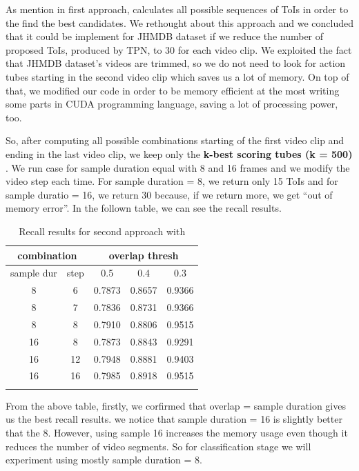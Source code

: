 \documentclass{report}
\begin{document}
As mention in first approach,  \cite{DBLP:journals/corr/HouCS17} calculates all possible sequences of ToIs in order to the find the best
candidates. We rethought about this approach and we concluded that it could be implement for JHMDB dataset if we reduce the number of proposed
ToIs, produced by TPN,  to 30 for each video clip. We exploited the fact that JHMDB dataset's videos are trimmed, so we do not need to look
for action tubes starting in the second video clip which saves us a lot of memory. On top of that, we modified our code
in order to be memory efficient at the most writing some parts in CUDA programming language, saving a lot of processing power, too. \par
So, after computing all possible combinations starting of the first video clip and ending in the last video clip, we keep only the
\textbf{k-best scoring tubes (k = 500) }. We run case for sample duration equal with 8 and 16 frames and we modify the video step each time.
For sample duration = 8, we return only 15 ToIs and for sample duratio = 16, we return 30 because, if we return more, we get ``out of memory error''.
In the follown table, we can see the recall results. \par

\begin{center}
\begin{longtable}{||c c||c c c||}

  \hline
  \multicolumn{2}{||c||}{\textbf{combination}} &\multicolumn{3}{|c||}{\textbf{overlap thresh}}\\
  \hline
  sample dur & step &  0.5  &  0.4 &  0.3 \\
  \hline   \hline

  8 & 6 & 0.7873 & 0.8657 & 0.9366  \\
  \hline
  8 & 7 & 0.7836 & 0.8731 & 0.9366  \\
  \hline
  8 &  8 & 0.7910 & 0.8806 & 0.9515 \\
  \hline 

  16 & 8  & 0.7873 & 0.8843 & 0.9291 \\
  \hline
  16 & 12 & 0.7948 & 0.8881 & 0.9403 \\
  \hline
  16 & 16 & 0.7985 & 0.8918 & 0.9515 \\
  \hline \hline
  \caption{Recall results for second approach with  }
  \label{table:conn_app3}
\end{longtable} 
\end{center}

From the above table, firstly, we corfirmed that overlap = sample duration gives us the best recall results. we notice that sample duration = 16 is
slightly better that the 8. However, using sample 16 increases the memory usage even though it reduces the number of video segments. So for classification stage
we will experiment using mostly sample duration = 8.
\end{document}
